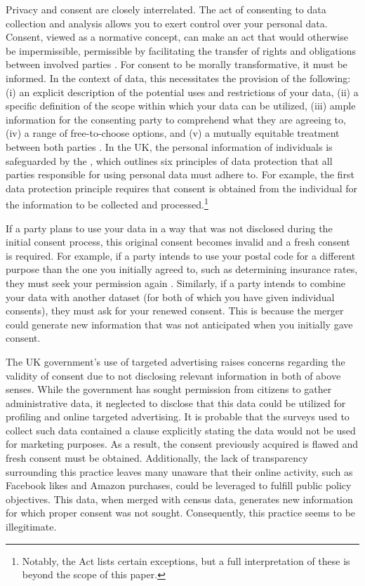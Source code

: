 \documentclass[preprint]{acmart}
\begin{document}
Privacy and consent are closely interrelated. The act of consenting to data collection and analysis allows you to exert control over your personal data. Consent, viewed as a normative concept, can make an act that would otherwise be impermissible, permissible by facilitating the transfer of rights and obligations between involved parties \cite{letajones2020}. For consent to be morally transformative, it must be informed. In the context of data, this necessitates the provision of the following: (i) an explicit description of the potential uses and restrictions of your data, (ii) a specific definition of the scope within which your data can be utilized, (iii) ample information for the consenting party to comprehend what they are agreeing to, (iv) a range of free-to-choose options, and (v) a mutually equitable treatment between both parties \cite{letajones2020}. In the UK, the personal information of individuals is safeguarded by the \textit{\citeauthor{dataprotection}}, which outlines six principles of data protection that all parties responsible for using personal data must adhere to. For example, the first data protection principle requires that consent is obtained from the individual for the information to be collected and processed.\footnote{Notably, the Act lists certain exceptions, but a full interpretation of these is beyond the scope of this paper.}


If a party plans to use your data in a way that was not disclosed during the initial consent process, this original consent becomes invalid and a fresh consent is required. For example, if a party intends to use your postal code for a different purpose than the one you initially agreed to, such as determining insurance rates, they must seek your permission again \cite{Andreotta2022}. Similarly, if a party intends to combine your data with another dataset (for both of which you have given individual consents), they must ask for your renewed consent. This is because the merger could generate new information that was not anticipated when you initially gave consent.




The UK government's use of targeted advertising raises concerns regarding the validity of consent due to not disclosing relevant information in both of above senses. While the government has sought permission from citizens to gather administrative data, it neglected to disclose that this data could be utilized for profiling and online targeted advertising. It is probable that the surveys used to collect such data contained a clause explicitly stating the data would not be used for marketing purposes. As a result, the consent previously acquired is flawed and fresh consent must be obtained. Additionally, the lack of transparency surrounding this practice leaves many unaware that their online activity, such as Facebook likes and Amazon purchases, could be leveraged to fulfill public policy objectives. This data, when merged with census data, generates new information for which proper consent was not sought. Consequently, this practice seems to be illegitimate.
\end{document}
